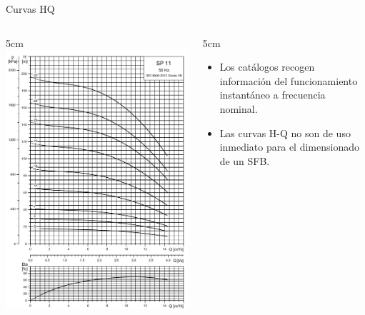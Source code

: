 \documentclass[xcolor={usenames,svgnames,dvipsnames}]{beamer}
\begin{document}
\begin{frame}[label=sec-4-2]{Curvas HQ}
\begin{columns}
\begin{column}{5cm\textwidth}
\includegraphics[height=0.8\textheight]{../figs/CurvaSP11.jpg}
\end{column}

\begin{column}{5cm\textwidth}
\begin{itemize}
\item Los catálogos recogen información del funcionamiento instantáneo a frecuencia nominal.
\item Las curvas H-Q no son de uso inmediato para el dimensionado de un SFB.
\end{itemize}
\end{column}
\end{columns}
\end{frame}
\end{document}
